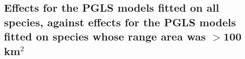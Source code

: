 \subsection{Effects for the PGLS models fitted on all species, against effects for the PGLS models fitted on species whose range area was $>$100 km$^2$}


